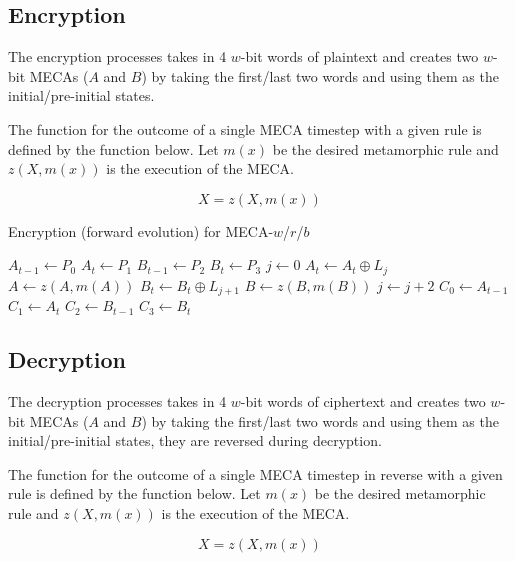 \documentclass{article}
\begin{document}
\subsection{Encryption}

The encryption processes takes in 4 $w$-bit words of plaintext and creates two $w$-bit MECAs ($A$ and $B$) by taking the first/last two words and using them as the initial/pre-initial states.

The function for the outcome of a single MECA timestep with a given rule is defined by the function below. Let $m(x)$ be the desired metamorphic rule and $z(X, m(x))$ is the execution of the MECA.

$$
	X = z(X, m(x)) 
$$

\begin{algorithm}[H]
  \begin{algorithmic}
    \caption{Encryption (forward evolution) for MECA-$w$/$r$/$b$}\label{alg:encryption}
    \Input
    \EndInput
    \Output
    \EndOutput
    \State $A_{t-1} \gets P_0$
    \State $A_{t} \gets P_1$
	\State $B_{t-1} \gets P_2$
	\State $B_{t} \gets P_3$
	\State $j \gets 0$
		\State $A_{t} \gets A_{t} \oplus L_j$
		\State $A \gets z(A, m(A))$
		\State $B_{t} \gets B_{t} \oplus L_{j+1}$
		\State $B \gets z(B, m(B))$
		\State $j \gets j + 2$
    \EndFor
    \State $C_0 \gets A_{t-1}$
    \State $C_1 \gets A_{t}$
    \State $C_2 \gets B_{t-1}$
    \State $C_3 \gets B_{t}$
  \end{algorithmic}
\end{algorithm}

\subsection{Decryption}

The decryption processes takes in 4 $w$-bit words of ciphertext and creates two $w$-bit MECAs ($A$ and $B$) by taking the first/last two words and using them as the initial/pre-initial states, they are reversed during decryption.

The function for the outcome of a single MECA timestep in reverse with a given rule is defined by the function below. Let $m(x)$ be the desired metamorphic rule and $z(X, m(x))$ is the execution of the MECA.

$$
	X = z(X, m(x)) 
$$
\end{document}
